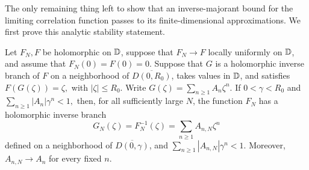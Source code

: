 The only remaining thing left to show that an inverse-majorant bound for the
limiting correlation function passes to its finite-dimensional
approximations. We first prove this analytic stability statement.

\begin{lemma}
\label{lem:finite-inverse-majorant-transfer}
Let $F_N,F$ be holomorphic on $\mathbb D$, suppose that $F_N\to F$ locally
uniformly on $\mathbb D$, and assume that $F_N(0)=F(0)=0$. Suppose that $G$ is a
holomorphic inverse branch of $F$ on a neighborhood of
$\overline{D(0,R_0)}$, takes values in $\mathbb D$, and satisfies
$
F(G(\zeta))=\zeta,$ with 
$
 |\zeta|\leq R_0.
$
Write
$
G(\zeta)=\sum_{n\geq 1}A_n\zeta^n.
$
If $0<\gamma<R_0$ and
$
\sum_{n\geq 1}|A_n|\gamma^n<1,
$
then, for all sufficiently large $N$, the function $F_N$ has a holomorphic
inverse branch
\[
G_N(\zeta)=F_N^{-1}(\zeta)=\sum_{n\geq 1}A_{n,N}\zeta^n
\]
defined on a neighborhood of $\overline{D(0,\gamma)}$, and
$
\sum_{n\geq 1}|A_{n,N}|\gamma^n<1.
$
Moreover, $A_{n,N}\to A_n$ for every fixed $n$.
\end{lemma}

